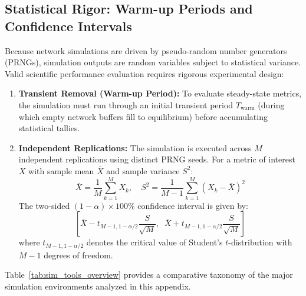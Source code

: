 \subsection{Statistical Rigor: Warm-up Periods and Confidence Intervals}
Because network simulations are driven by pseudo-random number generators (PRNGs), simulation outputs are random variables subject to statistical variance. Valid scientific performance evaluation requires rigorous experimental design:
\begin{enumerate}
    \item \textbf{Transient Removal (Warm-up Period):} To evaluate steady-state metrics, the simulation must run through an initial transient period $T_{\text{warm}}$ (during which empty network buffers fill to equilibrium) before accumulating statistical tallies.
    \item \textbf{Independent Replications:} The simulation is executed across $M$ independent replications using distinct PRNG seeds. For a metric of interest $X$ with sample mean $\bar{X}$ and sample variance $S^2$:
    \begin{equation}
        \bar{X} = \frac{1}{M} \sum_{k=1}^M X_k, \quad S^2 = \frac{1}{M-1} \sum_{k=1}^M (X_k - \bar{X})^2
    \end{equation}
    The two-sided $(1 - \alpha) \times 100\%$ confidence interval is given by:
    \begin{equation}
        \left[ \bar{X} - t_{M-1, 1 - \alpha/2} \frac{S}{\sqrt{M}}, \;\; \bar{X} + t_{M-1, 1 - \alpha/2} \frac{S}{\sqrt{M}} \right]
    \end{equation}
    where $t_{M-1, 1 - \alpha/2}$ denotes the critical value of Student's $t$-distribution with $M - 1$ degrees of freedom.
\end{enumerate}

Table~\ref{tab:sim_tools_overview} provides a comparative taxonomy of the major simulation environments analyzed in this appendix.

